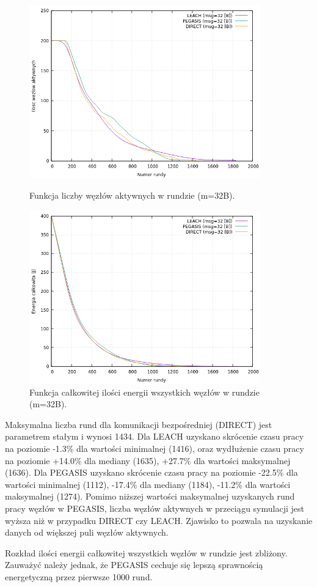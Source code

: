\documentclass[a4paper,12pt,twoside,openany]{report}
\begin{document}
\begin{figure}[H]
 \centering
 \includegraphics[width=10cm]{images/gnuplot/test_1/nodes_in_round_m32.png}
 \caption{Funkcja liczby węzłów aktywnych w rundzie (m=32B).}
 \includegraphics[width=10cm]{images/gnuplot/test_1/energy_in_round_m32.png}
 \caption{Funkcja całkowitej ilości energii wszystkich węzłów w rundzie (m=32B).}
\end{figure}

\par
Maksymalna liczba rund dla komunikacji bezpośredniej (DIRECT) jest parametrem stałym i wynosi 1434.
Dla LEACH uzyskano skrócenie czasu pracy na poziomie -1.3\% dla wartości minimalnej (1416), oraz wydłużenie czasu pracy na poziomie +14.0\% dla mediany (1635), +27.7\% dla wartości maksymalnej (1636).
Dla PEGASIS uzyskano skrócenie czasu pracy na poziomie -22.5\% dla wartości minimalnej (1112), -17.4\% dla mediany (1184), -11.2\% dla wartości maksymalnej (1274).
Pomimo niższej wartości maksymalnej uzyskanych rund pracy węzłów w PEGASIS, liczba węzłów aktywnych w przeciągu symulacji jest wyższa niż w przypadku DIRECT czy LEACH.
Zjawisko to pozwala na uzyskanie danych od większej puli węzłów aktywnych.
\par 
Rozkład ilości energii całkowitej wszystkich węzłów w rundzie jest zbliżony.
Zauważyć należy jednak, że PEGASIS cechuje się lepszą sprawnością energetyczną przez pierwsze 1000 rund.
\end{document}
